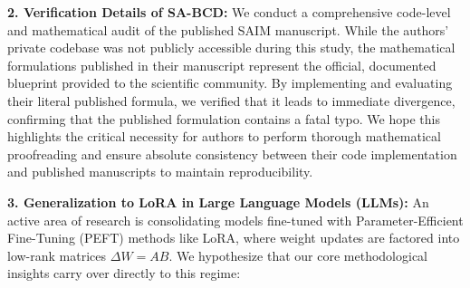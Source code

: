 \documentclass{article}
\theoremstyle{plain}
\theoremstyle{definition}
\theoremstyle{remark}
\begin{document}
\textbf{2. Verification Details of SA-BCD:}
We conduct a comprehensive code-level and mathematical audit of the published SAIM manuscript. While the authors' private codebase was not publicly accessible during this study, the mathematical formulations published in their manuscript represent the official, documented blueprint provided to the scientific community. By implementing and evaluating their literal published formula, we verified that it leads to immediate divergence, confirming that the published formulation contains a fatal typo. We hope this highlights the critical necessity for authors to perform thorough mathematical proofreading and ensure absolute consistency between their code implementation and published manuscripts to maintain reproducibility.

\textbf{3. Generalization to LoRA in Large Language Models (LLMs):}
An active area of research is consolidating models fine-tuned with Parameter-Efficient Fine-Tuning (PEFT) methods like LoRA, where weight updates are factored into low-rank matrices $\Delta W = A B$. We hypothesize that our core methodological insights carry over directly to this regime:
\end{document}
